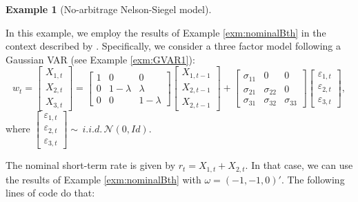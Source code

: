 \documentclass[
  12pt,
]{book}
\theoremstyle{definition}
\theoremstyle{definition}
\newtheorem{example}{Example}[chapter]
\theoremstyle{definition}
\theoremstyle{definition}
\theoremstyle{remark}
\begin{document}
\begin{example}[No-arbitrage Nelson-Siegel model]
\protect\hypertarget{exm:CDR2009}{}\label{exm:CDR2009}

In this example, we employ the results of Example \ref{exm:nominalBth} in the context described by \citet{Christensen_Diebold_Rudebusch_2009}. Specifically, we consider a three factor model following a Gaussian VAR (see Example \ref{exm:GVAR1}):
\[
w_t = \left[\begin{array}{c}X_{1,t}\\X_{2,t}\\X_{3,t}\end{array}\right] = 
\left[\begin{array}{ccc}
1 & 0 & 0\\
0&1-\lambda&\lambda\\
0&0&1-\lambda\end{array}\right]
\left[\begin{array}{c}X_{1,t-1}\\X_{2,t-1}\\X_{2,t-1}\end{array}\right] +
\left[\begin{array}{ccc}
\sigma_{11} & 0 & 0\\
\sigma_{21}&\sigma_{22}&0\\
\sigma_{31}&\sigma_{32}&\sigma_{33}\end{array}\right]
\left[\begin{array}{c}\varepsilon_{1,t}\\\varepsilon_{2,t}\\\varepsilon_{3,t}\end{array}\right],
\]
where \(\left[\begin{array}{c}\varepsilon_{1,t}\\\varepsilon_{2,t}\\\varepsilon_{3,t}\end{array}\right] \sim \,i.i.d.\, \mathcal{N}(0,Id)\).

The nominal short-term rate is given by \(r_t = X_{1,t}+X_{2,t}\). In that case, we can use the results of Example \ref{exm:nominalBth} with \(\omega = (-1,-1,0)'\). The following lines of code do that:


\end{example}
\end{document}
